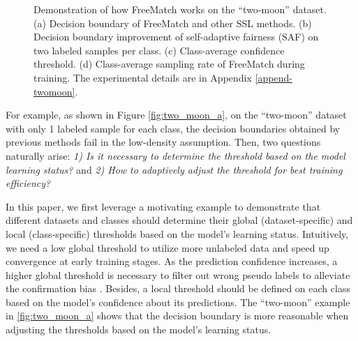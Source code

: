 \documentclass{article} \usepackage{iclr2023_conference,times}
\theoremstyle{plain}
\theoremstyle{definition}
\theoremstyle{remark}
\begin{document}
\begin{figure}[t!]
\label{fig:two_moon}
\centering    
\hfill
{}
\hfill
{}
\hfill
{}
\hfill
{}
\vspace{-.1in}
\caption{Demonstration of how FreeMatch works on the ``two-moon'' dataset. (a) Decision boundary of FreeMatch and other SSL methods. (b) Decision boundary improvement of self-adaptive fairness (SAF) on two labeled samples per class. (c) Class-average confidence threshold. (d) Class-average sampling rate of FreeMatch during training. The experimental details are in Appendix \ref{append-twomoon}. }
\vspace{-.3in}
\end{figure}



For example, as shown in Figure \ref{fig:two_moon_a}, on the ``two-moon'' dataset with only 1 labeled sample for each class, the decision boundaries obtained by previous methods fail in the low-density assumption. Then, two questions naturally arise: \emph{1) Is it necessary to determine the threshold based on the model learning status?} and \emph{2) How to adaptively adjust the threshold for best training efficiency?}

In this paper, we first leverage a motivating example to demonstrate that different datasets and classes should determine their global (dataset-specific) and local (class-specific) thresholds based on the model's learning status.
Intuitively, we need a low global threshold to utilize more unlabeled data and speed up convergence at early training stages.
As the prediction confidence increases, a higher global threshold is necessary to filter out wrong pseudo labels to alleviate the confirmation bias \citep{arazo2020pseudo}.
Besides, a local threshold should be defined on each class based on the model's confidence about its predictions.
The ``two-moon'' example in \cref{fig:two_moon_a} shows that the decision boundary is more reasonable when adjusting the thresholds based on the model's learning status.
\end{document}
